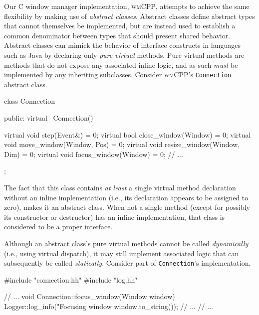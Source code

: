 Our  C\text{++}  window  manager  implementation,  \textsc{wmCPP},  attempts  to
achieve  the  same  flexibility  by making  use  of  \textit{abstract  classes}.
Abstract classes  define abstract types  that cannot themselves  be implemented,
but  are instead  used  to establish  a common  denominator  between types  that
should  present shared  behavior. Abstract  classes can  mimick the  behavior of
interface constructs  in languages such  as Java by declaring  only \textit{pure
virtual}  methods. Pure  virtual  methods are  methods that  do  not expose  any
associated  inline  logic, and  as  such  \textit{must}  be implemented  by  any
inheriting  subclasses.  Consider \textsc{wmCPP}'s  \texttt{Connection}
abstract class.


\begin{cppblock}
  class Connection
  {
  public:
    virtual ~Connection() {}
  
    virtual void step(Event&) = 0;
    virtual bool close_window(Window) = 0;
    virtual void move_window(Window, Pos) = 0;
    virtual void resize_window(Window, Dim) = 0;
    virtual void focus_window(Window) = 0;
    // ...
  };
\end{cppblock}

The fact  that this  class contains  \textit{at least}  a single  virtual method
declaration  without an  inline  implementation (i.e.,  its declaration  appears
to  be  assigned to  zero),  makes  it an  abstract  class.  When not  a  single
method  (except  for possibly  its  constructor  or  destructor) has  an  inline
implementation, that class is considered to be a proper interface.

Although   an  abstract   class's  pure   virtual  methods   cannot  be   called
\textit{dynamically}  (i.e., using  virtual  dispatch), it  may still  implement
associated logic  that can subsequently be  called \textit{statically}. Consider
part of \texttt{Connection}'s implementation.


\begin{cppblock}
  #include "connection.hh"
  #include "log.hh"

  // ...
  void
  Connection::focus_window(Window window)
  {
    Logger::log_info("Focusing window %
      window.to_string());
    // ...
  }
  // ...
\end{cppblock}

